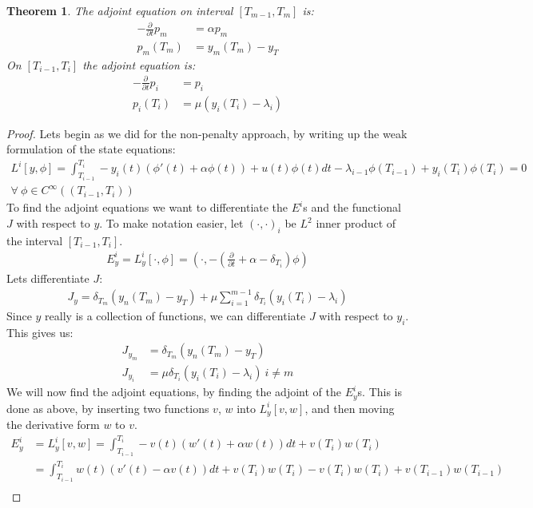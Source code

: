 \documentclass[11pt,a4paper]{article}
\newtheorem{theorem}{Theorem}
\begin{document}
\begin{theorem}
The adjoint equation on interval $[T_{m-1},T_m]$ is:
\begin{align*}
-\frac{\partial }{\partial t}p_m &=\alpha p_m  \\
p_m(T_{m}) &= y_m(T_{m})-y_T
\end{align*}
On $[T_{i-1},T_i]$ the adjoint equation is:
\begin{align*}
-\frac{\partial }{\partial t}p_i &=p_i  \\
p_i(T_{i}) &= \mu(y_{i}(T_{i})-\lambda_{i} )
\end{align*}
\end{theorem} 
\begin{proof}
Lets begin as we did for the non-penalty approach, by writing up the weak formulation of the state equations:
\begin{gather*}
L^i[y,\phi] = \int_{T_{i-1}}^{T_{i}}-y_i(t)(\phi'(t) +\alpha \phi(t))+u(t)\phi(t)dt -\lambda_{i-1}\phi(T_{i-1})+ y_i(T_i)\phi(T_i) =0\\ \forall \ \phi \in C^{\infty}((T_{i-1},T_{i}))
\end{gather*} 
To find the adjoint equations we want to differentiate the $E^i$s and the functional $J$ with respect to $y$. To make notation easier, let $(\cdot,\cdot)_i$ be $L^2$ inner product of the interval $[T_{i-1},T_i]$. 
\begin{align*}
E_y^i=L_y^i[\cdot,\phi]=(\cdot,-(\frac{\partial}{\partial t} + \alpha - \delta_{T_i})\phi) 
\end{align*}
Lets differentiate $J$:
\begin{align*}
J_y = \delta_{T_{m}}(y_n(T_{m})-y_T) + \mu \sum_{i=1}^{m-1} \delta_{T_{i}}(y_{i}(T_i)-\lambda_i ) 
\end{align*}
Since $y$ really is a collection of functions, we can differentiate $J$ with respect to $y_i$. This gives us:
\begin{align*}
J_{y_m} &= \delta_{T_{m}}(y_n(T_{m})-y_T) \\
J_{y_i} &= \mu\delta_{T_{i}}(y_{i}(T_i)-\lambda_i ) \ i\neq m
\end{align*}
We will now find the adjoint equations, by finding the adjoint of the $E_y^i$s. This is done as above, by inserting two functions $v$, $w$ into $L_y^i[v,w]$, and then moving the derivative form $w$ to $v$.
\begin{align*}
E_y^i&=L_y^i[v,w]=\int_{T_{i-1}}^{T_i}-v(t)(w'(t)+\alpha w(t))dt + v(T_i)w(T_i) \\
&=\int_{T_{i-1}}^{T_i}w(t)(v'(t)-\alpha v(t))dt + v(T_i)w(T_i)-v(T_i)w(T_i) +v(T_{i-1})w(T_{i-1}) \\

\end{align*}
\end{proof}
\end{document}
